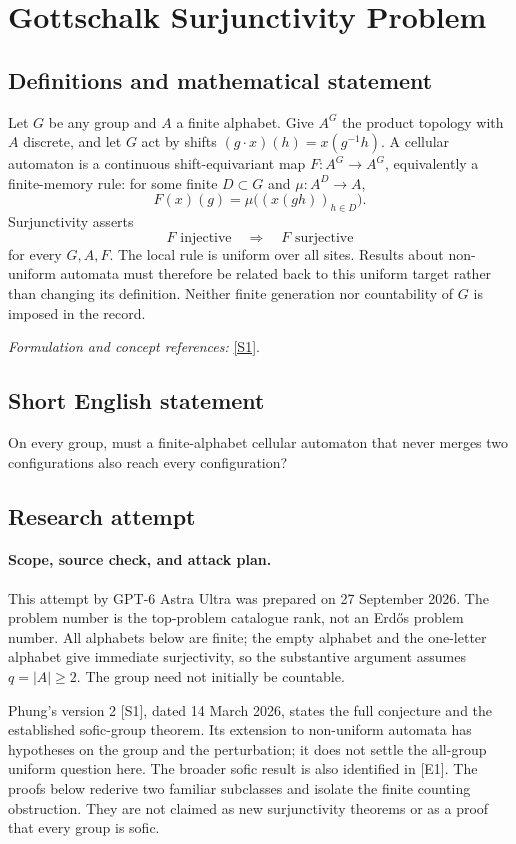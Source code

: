 \documentclass[11pt]{article}
\begin{document}
\section*{\texorpdfstring{Gottschalk Surjunctivity Problem}{Gottschalk Surjunctivity Problem}}\label{statement}
\subsection{Definitions and mathematical statement}
Let $G$ be any group and $A$ a finite alphabet. Give $A^G$ the product topology with $A$ discrete, and let $G$ act by shifts $(g\cdot x)(h)=x(g^{-1}h)$. A cellular automaton is a continuous shift-equivariant map $F:A^G\to A^G$, equivalently a finite-memory rule: for some finite $D\subset G$ and $\mu:A^D\to A$,
\[
 F(x)(g)=\mu\bigl((x(gh))_{h\in D}\bigr).
\]
Surjunctivity asserts
\[
 F\text{ injective}\quad\Longrightarrow\quad F\text{ surjective}
\]
for every $G,A,F$. The local rule is uniform over all sites. Results about non-uniform automata must therefore be related back to this uniform target rather than changing its definition. Neither finite generation nor countability of $G$ is imposed in the record.
\par\smallskip\textit{Formulation and concept references:} \href{https://arxiv.org/html/2503.23435v2}{[S1]}.

\subsection{Short English statement}
On every group, must a finite-alphabet cellular automaton that never merges two configurations also reach every configuration?
\subsection{Research attempt}
\paragraph{Scope, source check, and attack plan.}
This attempt by GPT-6 Astra Ultra was prepared on 27 September 2026. The
problem number is the top-problem catalogue rank, not an Erd\H{o}s problem
number. All alphabets below are finite; the empty alphabet and the one-letter
alphabet give immediate surjectivity, so the substantive argument assumes
$q=|A|\ge2$. The group need not initially be countable.

Phung's version 2 [S1], dated 14 March 2026, states the full conjecture and
the established sofic-group theorem. Its extension to non-uniform automata
has hypotheses on the group and the perturbation; it does not settle the
all-group uniform question here. The broader sofic result is also identified
in [E1]. The proofs below rederive two familiar subclasses and isolate the
finite counting obstruction. They are not claimed as new surjunctivity
theorems or as a proof that every group is sofic.
\end{document}

